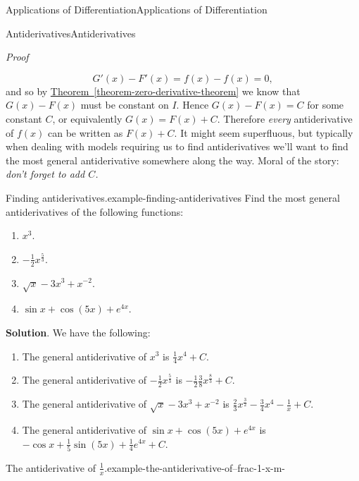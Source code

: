 \documentclass[10pt,]{book}
\makeatletter
\renewcommand*{\proofname}{Proof}
\renewenvironment{proof}[1][\proofname]{\par
  \pushQED{\qed}%
  \normalfont \topsep6\p@\@plus6\p@\relax
  \trivlist
  \item\relax
    {\itshape
    #1\@addpunct{.}}\hspace\labelsep\ignorespaces
}{%
  \popQED\endtrivlist\@endpefalse
}
\numberwithin{equation}{section}
\makeatother
\begin{document}
\begin{chapterptx}{Applications of Differentiation}{}{Applications of Differentiation}{}{}
\begin{sectionptx}{Antiderivatives}{}{Antiderivatives}{}{}
\begin{proof}
\begin{equation*}
G'(x) - F'(x) = f(x) - f(x) = 0,
\end{equation*}
and so by \hyperref[theorem-zero-derivative-theorem]{Theorem~\ref{theorem-zero-derivative-theorem}} we know that \(G(x) - F(x)\) must be constant on \(I\). Hence \(G(x) - F(x) = C\) for some constant \(C\), or equivalently \(G(x) = F(x)+C\). Therefore \emph{every} antiderivative of \(f(x)\) can be written as \(F(x) + C\).%
\end{proof}
\hypertarget{p-384}{}%
It might seem superfluous, but typically when dealing with models requiring us to find antiderivatives we'll want to find the most general antiderivative somewhere along the way. Moral of the story: \emph{don't forget to add \(C\).}%
\begin{example}{Finding antiderivatives.}{example-finding-antiderivatives}%
\hypertarget{p-385}{}%
Find the most general antiderivatives of the following functions: \leavevmode%
\begin{enumerate}
\item\hypertarget{li-28}{}\(x^{3}.\)%
\item\hypertarget{li-29}{}\(-\frac{1}{2}x^{\frac{5}{3}}.\)%
\item\hypertarget{li-30}{}\(\sqrt{x} - 3x^{3} + x^{-2}.\)%
\item\hypertarget{li-31}{}\(\sin x + \cos (5x) + e^{4x}.\)%
\end{enumerate}
%
\par\smallskip%
\noindent\textbf{Solution}.\hypertarget{solution-85}{}\quad%
\hypertarget{p-386}{}%
We have the following: \leavevmode%
\begin{enumerate}
\item\hypertarget{li-32}{}The general antiderivative of \(x^{3}\) is \(\frac{1}{4}x^{4}+C.\)%
\item\hypertarget{li-33}{}The general antiderivative of \(-\frac{1}{2}x^{\frac{5}{3}}\) is \(-\frac{1}{2}\frac{3}{8}x^{\frac{8}{3}}+C.\)%
\item\hypertarget{li-34}{}The general antiderivative of \(\sqrt{x} - 3x^{3} + x^{-2}\) is \(\frac{2}{3}x^{\frac{3}{2}} - \frac{3}{4}x^{4} - \frac{1}{x} + C\).%
\item\hypertarget{li-35}{}The general antiderivative of \(\sin x + \cos (5x) + e^{4x}\) is \(-\cos x + \frac{1}{5}\sin(5x) + \frac{1}{4}e^{4x} + C.\)%
\end{enumerate}
%
\end{example}
\begin{example}{The antiderivative of \(\frac{1}{x}\).}{example-the-antiderivative-of--frac-1-x-m-}%

\end{example}
\end{sectionptx}
\end{chapterptx}
\end{document}
